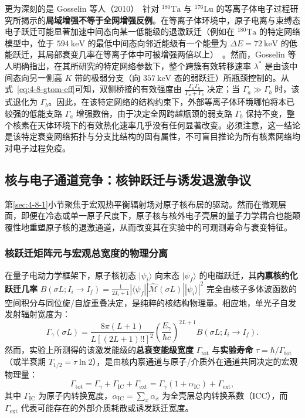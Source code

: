 更为深刻的是 Gosselin 等人（2010）~\cite{gosselin-2010-plasma-isomers-176lu-180ta}针对 $^{180}\mathrm{Ta}$ 与 $^{176}\mathrm{Lu}$ 的等离子体电子过程研究所揭示的\textbf{局域增强不等于全网增强反例}。在等离子体环境中，原子电离与束缚态电子跃迁可能显著加速中间态向某一低能级的退激跃迁（例如在 $^{180}\mathrm{Ta}$ 的特定网络模型中，位于 $594\ \mathrm{keV}$ 的最低中间态向邻近能级有一个能量为 $\Delta E = 72\ \mathrm{keV}$ 的低能跃迁，其局部衰变几率在等离子体中可被增强两倍以上）~\cite{gosselin-2010-plasma-isomers-176lu-180ta}。然而，Gosselin 等人明确指出，在其所研究的特定网络参数下，整个跨簇有效转移速率 $\lambda^*$ 是由该中间态向另一侧高 $K$ 带的极弱分支（向 $357\ \mathrm{keV}$ 态的弱跃迁）所瓶颈控制的。从式~\eqref{eq:4-8-gtom-eff}可知，双侧桥接的有效强度由 $\frac{\Gamma_a \Gamma_b}{\Gamma_a + \Gamma_b}$ 决定；当 $\Gamma_a \gg \Gamma_b$ 时，该式退化为 $\Gamma_b$。因此，在该特定网络的结构约束下，外部等离子体环境哪怕将本已较强的低能支路 $\Gamma_a$ 增强数倍，由于决定全网跨越瓶颈的弱支路 $\Gamma_b$ 保持不变，整个核素在天体环境下的有效热化速率几乎没有任何显著改变。必须注意，这一结论是该特定衰变网络拓扑与分支比结构的固有属性，不可盲目推论为所有核素网络均对电子过程免疫。

\subsection{核与电子通道竞争：核钟跃迁与诱发退激争议}\label{sec:4-8-2}

第\ref{sec:4-8-1}小节聚焦于宏观热平衡辐射场对原子核布居的驱动。然而在微观层面，即便在冷态或单一原子尺度下，原子核与核外电子壳层的量子力学耦合也能颠覆性地重塑原子核的退激通道，从而改变其在实验中的可观测寿命与衰变特征。

\subsubsection{核跃迁矩阵元与宏观总宽度的物理分离}

在量子电动力学框架下，原子核初态 $|\psi_i\rangle$ 向末态 $|\psi_f\rangle$ 的电磁跃迁，其\textbf{内禀核约化跃迁几率} $B(\sigma L; I_i \to I_f) = \frac{1}{2I_i + 1} |\langle \psi_f || \hat{\mathcal{M}}(\sigma L) || \psi_i \rangle|^2$ 完全由核子多体波函数的空间积分与同位旋/自旋重叠决定，是纯粹的核结构物理量。相应地，单光子自发发射辐射宽度为：
\begin{equation}\label{eq:4-8-rad-width-intrinsic}
\Gamma_\gamma(\sigma L) = \frac{8\pi (L+1)}{L [(2L+1)!!]^2} \left(\frac{E_\gamma}{\hbar c}\right)^{2L+1} B(\sigma L; I_i \to I_f).
\end{equation}
然而，实验上所测得的该激发能级的\textbf{总衰变能级宽度} $\Gamma_{\mathrm{tot}}$ 与\textbf{实验寿命} $\tau = \hbar / \Gamma_{\mathrm{tot}}$（或半衰期 $T_{1/2} = \tau \ln 2$），是由核内禀通道与原子/介质外在通道共同决定的宏观物理量：
\begin{equation}\label{eq:4-8-tot-width-decompose}
\Gamma_{\mathrm{tot}} = \Gamma_\gamma + \Gamma_{\mathrm{IC}} + \Gamma_{\mathrm{ext}} = \Gamma_\gamma (1 + \alpha_{\mathrm{IC}}) + \Gamma_{\mathrm{ext}},
\end{equation}
其中 $\Gamma_{\mathrm{IC}}$ 为原子内转换宽度，$\alpha_{\mathrm{IC}} = \sum_x \alpha_x$ 为全壳层总内转换系数（ICC），而 $\Gamma_{\mathrm{ext}}$ 代表可能存在的外部介质耗散或诱发跃迁宽度。

